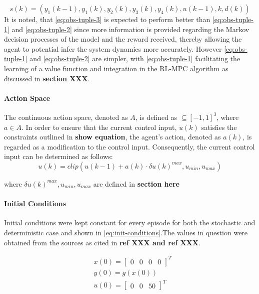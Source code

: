 \label{eq:obs-tuple-3}
\begin{equation}
    s(k) = (y_1(k-1),y_1(k),y_2(k),y_3(k),y_4(k), u(k-1), k, d(k))
\end{equation}
It is noted, that \autoref{eq:obs-tuple-3} is expected to perform better than \autoref{eq:obs-tuple-1} and \autoref{eq:obs-tuple-2} since more information is provided regarding the Markov decision processes of the model and the reward received, thereby allowing the agent to potential infer the system dynamics more accurately. However \autoref{eq:obs-tuple-1} and \autoref{eq:obs-tuple-2} are simpler, with \autoref{eq:obs-tuple-1} facilitating the learning of a value function and integration in the RL-MPC algorithm as discussed in \textbf{section XXX}. 

\paragraph{Action Space}
The continuous action space, denoted as $A$, is defined as $ \subseteq [-1,1]^3$, where $a \in A$. In order to ensure that the current control input, $u(k)$ satisfies the constraints outlined in  \textbf{show equation}, the agent's action, denoted as $a(k)$, is regarded as a modification to the control input. Consequently, the current control input can be determined as follows:
$$
u(k) = clip(u(k-1) + a(k) \cdot \delta u(k)^{max},u_{min}, u_{max})
$$

where $\delta u(k)^{max},u_{min}, u_{max}$ are defined in \textbf{section here}

\paragraph{Initial Conditions}
Initial conditions were kept constant for every episode for both the stochastic and deterministic case and shown in \autoref{eq:init-conditions}.The values in question were obtained from the sources as cited in \textbf{ref XXX and ref XXX}.

\begin{equation}
    \label{eq:init-conditions}
    \begin{aligned}
        &x(0) = \begin{bmatrix}
            0 & 0 & 0 & 0
        \end{bmatrix}^T \\
        &y(0) = g(x(0)) \\
        &u(0) = \begin{bmatrix}
            0 & 0 & 50
        \end{bmatrix}^T
    \end{aligned}
\end{equation}

